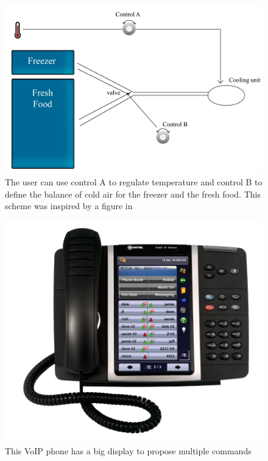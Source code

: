\documentclass[a4paper,11pt] {article}
\theoremstyle{definition}
\begin{document}
 \begin{minipage}{\linewidth}
      \centering
      \begin{minipage}{0.45\linewidth}
          \begin{figure}[H]
          \centering
              \includegraphics[scale=0.1]{fig-report/conceptual.jpg}
              \caption{The user can use control A to regulate temperature and control B to define the balance of cold air for the freezer and the fresh food. This scheme was inspired by a figure in  \cite{Norman02}}
          \end{figure}
      \end{minipage}
      \hspace{0.05\linewidth}
      \begin{minipage}{0.45\linewidth}
          \begin{figure}[H]
                    \centering
               \includegraphics[scale=0.7]{fig-report/voip-phone.jpg}
              \caption{This VoIP phone has a big display to propose multiple commands}
          \end{figure}
      \end{minipage}
  \end{minipage}
\end{document}
